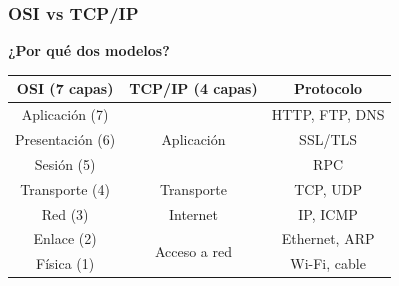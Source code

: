 \documentclass[aspectratio=169]{beamer}
\begin{document}
            
\begin{frame}
\frametitle{OSI vs TCP/IP}

\begin{center}
\Large \textbf{¿Por qué dos modelos?}
\end{center}

\begin{center}
\begin{table}
\centering
\begin{tabular}{|c|c|c|}
\hline
\textbf{OSI (7 capas)} & \textbf{TCP/IP (4 capas)} & \textbf{Protocolo} \\
\hline
\rowcolor{lightBlue} Aplicación (7) & \multirow{3}{*}{Aplicación} & HTTP, FTP, DNS \\
\rowcolor{lightBlue} Presentación (6) & & SSL/TLS \\
\rowcolor{lightBlue} Sesión (5) & & RPC \\
\rowcolor{lightOrange} Transporte (4) & Transporte & TCP, UDP \\
\rowcolor{lightBlue} Red (3) & Internet & IP, ICMP \\
\rowcolor{lightOrange} Enlace (2) & \multirow{2}{*}{Acceso a red} & Ethernet, ARP \\
\rowcolor{lightOrange} Física (1) & & Wi-Fi, cable \\
\hline
\end{tabular}
\end{table}
\end{center}

\end{frame}
            
\end{document}
